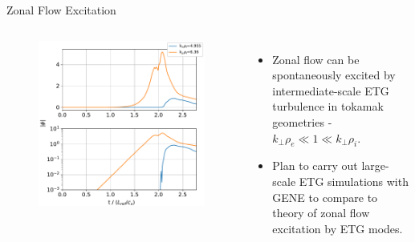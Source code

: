 \documentclass[aspectratio=43]{beamer}
\begin{document}
   \begin{frame}{Zonal Flow Excitation}
      \begin{columns}
            \begin{figure}
               \vspace*{-.6cm}\includegraphics[scale=.45]{Images/zonalFlow.pdf}
            \end{figure}
            \vspace*{-.5cm}
            \begin{itemize}
               \item Zonal flow can be spontaneously excited by intermediate-scale ETG turbulence in tokamak geometries - 
               $k_{\perp}\rho_e \ll 1 \ll k_{\perp}\rho_i$.
               \item Plan to carry out large-scale ETG simulations with GENE to compare to theory of zonal flow excitation by ETG modes.
            \end{itemize}
      \end{columns}
   \end{frame}
\end{document}
